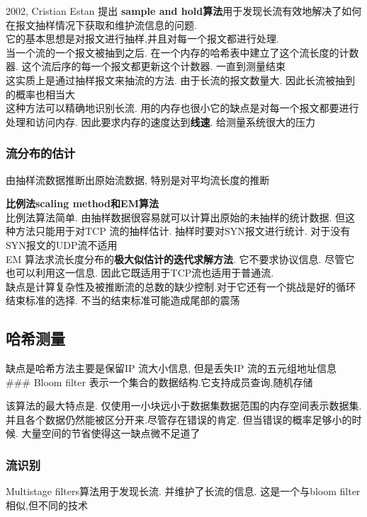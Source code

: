 \documentclass{article}
\begin{document}
2002, Cristian Estan 提出 \textbf{sample and
hold算法}用于发现长流有效地解决了如何在报文抽样情况下获取和维护流信息的问题.\\
它的基本思想是对报文进行抽样,并且对每一个报文都进行处理.\\
当一个流的一个报文被抽到之后.  在一个内存的哈希表中建立了这个流长度的计数器. 这个流后序的每一个报文都更新这个计数器. 一直到测量结束\\
这实质上是通过抽样报文来抽流的方法.  由于长流的报文数量大. 因此长流被抽到的概率也相当大\\
这种方法可以精确地识别长流.  用的内存也很小它的缺点是对每一个报文都要进行处理和访问内存.  因此要求内存的速度达到\textbf{线速}. 给测量系统很大的压力

\subsubsection{流分布的估计}\label{ux6d41ux5206ux5e03ux7684ux4f30ux8ba1}
由抽样流数据推断出原始流数据, 特别是对平均流长度的推断

\textbf{比例法scaling method和EM算法}\\比例法算法简单.
由抽样数据很容易就可以计算出原始的未抽样的统计数据.  但这种方法只能用于对TCP 流的抽样估计. 抽样时要对SYN报文进行统计.  对于没有SYN报文的UDP流不适用\\
EM 算法求流长度分布的\textbf{极大似估计的迭代求解方法}. 它不要求协议信息.  尽管它也可以利用这一信息. 因此它既适用于TCP流也适用于普通流.\\
缺点是计算复杂性及被推断流的总数的缺少控制.对于它还有一个挑战是好的循环结束标准的选择. 不当的结束标准可能造成尾部的震荡

\subsection{哈希测量}\label{ux54c8ux5e0cux6d4bux91cf}

缺点是哈希方法主要是保留IP 流大小信息, 但是丢失IP 流的五元组地址信息
\#\#\# Bloom filter 表示一个集合的数据结构.它支持成员查询,随机存储

该算法的最大特点是.
仅使用一小块远小于数据集数据范围的内存空间表示数据集.
并且各个数据仍然能被区分开来.尽管存在错误的肯定.
但当错误的概率足够小的时候. 大量空间的节省使得这一缺点微不足道了

\subsubsection{流识别}\label{ux6d41ux8bc6ux522b}
Multistage filters算法用于发现长流. 并维护了长流的信息. 这是一个与bloom
filter相似,但不同的技术
\end{document}
